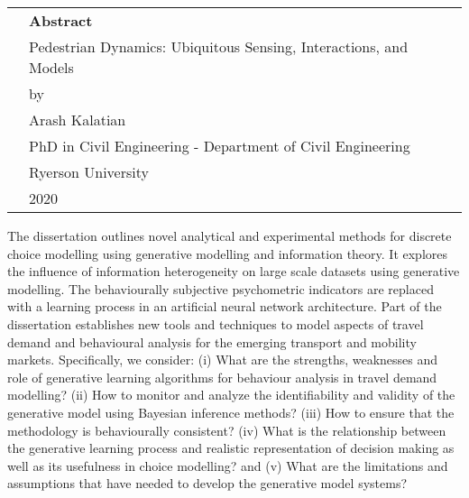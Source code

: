 \thispagestyle{plain}

\begin{table}[!h]
\centering

\begin{tabu}{X[0.1,c] X[0.5,c] X[0.1,c]}
    &\textbf{Abstract}&\\[1em]
    &Pedestrian Dynamics: Ubiquitous Sensing, Interactions, and Models&\\[0.7em]
    &by&\\[0.7em]
    &Arash Kalatian&\\[0.7em]
    &PhD in Civil Engineering - Department of Civil Engineering&\\[0.7em]
    &Ryerson University&\\[0.7em]
    &2020&\\[1em]
\end{tabu}
\end{table}


The dissertation outlines novel analytical and experimental methods for discrete choice modelling using generative modelling and information theory.
It explores the influence of information heterogeneity on large scale datasets using generative modelling.
The behaviourally subjective psychometric indicators are replaced with a learning process in an artificial neural network architecture.
Part of the dissertation establishes new tools and techniques to model aspects of travel demand and behavioural analysis for the emerging transport and mobility markets.
Specifically, we consider: (i) What are the strengths, weaknesses and role of generative learning algorithms for behaviour analysis in travel demand modelling?
(ii) How to monitor and analyze the identifiability and validity of the generative model using Bayesian inference methods?
(iii) How to ensure that the methodology is behaviourally consistent?
(iv) What is the relationship between the generative learning process and realistic representation of decision making as well as its usefulness in choice modelling? and
(v) What are the limitations and assumptions that have needed to develop the generative model systems?

